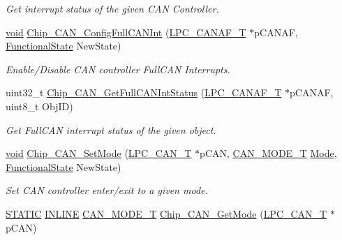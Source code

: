 \begin{DoxyCompactItemize}
\begin{DoxyCompactList}\small\item\em Get interrupt status of the given C\-A\-N Controller. \end{DoxyCompactList}\item 
\hyperlink{Paradigm_2Tern__EE_2small_2portmacro_8h_a14d32f8130d3c0b212cfc751730b5b49}{void} \hyperlink{group__CAN__17XX__40XX_ga90ebd27acbebb24951b5707abca13220}{Chip\-\_\-\-C\-A\-N\-\_\-\-Config\-Full\-C\-A\-N\-Int} (\hyperlink{structLPC__CANAF__T}{L\-P\-C\-\_\-\-C\-A\-N\-A\-F\-\_\-\-T} $\ast$p\-C\-A\-N\-A\-F, \hyperlink{group__LPC__Types__Public__Types_gac9a7e9a35d2513ec15c3b537aaa4fba1}{Functional\-State} New\-State)
\begin{DoxyCompactList}\small\item\em Enable/\-Disable C\-A\-N controller Full\-C\-A\-N Interrupts. \end{DoxyCompactList}\item 
uint32\-\_\-t \hyperlink{group__CAN__17XX__40XX_gaf955e0441bf4ca24b8c72f59aabbd9e8}{Chip\-\_\-\-C\-A\-N\-\_\-\-Get\-Full\-C\-A\-N\-Int\-Status} (\hyperlink{structLPC__CANAF__T}{L\-P\-C\-\_\-\-C\-A\-N\-A\-F\-\_\-\-T} $\ast$p\-C\-A\-N\-A\-F, uint8\-\_\-t Obj\-I\-D)
\begin{DoxyCompactList}\small\item\em Get Full\-C\-A\-N interrupt status of the given object. \end{DoxyCompactList}\item 
\hyperlink{Paradigm_2Tern__EE_2small_2portmacro_8h_a14d32f8130d3c0b212cfc751730b5b49}{void} \hyperlink{group__CAN__17XX__40XX_gad935e9c3c93278bb18b99df67ba52516}{Chip\-\_\-\-C\-A\-N\-\_\-\-Set\-Mode} (\hyperlink{structLPC__CAN__T}{L\-P\-C\-\_\-\-C\-A\-N\-\_\-\-T} $\ast$p\-C\-A\-N, \hyperlink{group__CAN__17XX__40XX_ga57c03b9f9b4ebf86dccc13baf8c2889c}{C\-A\-N\-\_\-\-M\-O\-D\-E\-\_\-\-T} \hyperlink{ioat91sam7x256_8h_a2c3349c7d637bdca4752c232da5df71c}{Mode}, \hyperlink{group__LPC__Types__Public__Types_gac9a7e9a35d2513ec15c3b537aaa4fba1}{Functional\-State} New\-State)
\begin{DoxyCompactList}\small\item\em Set C\-A\-N controller enter/exit to a given mode. \end{DoxyCompactList}\item 
\hyperlink{group__LPC__Types__Public__Macros_ga10b2d890d871e1489bb02b7e70d9bdfb}{S\-T\-A\-T\-I\-C} \hyperlink{group__LPC__Types__Public__Types_ga2eb6f9e0395b47b8d5e3eeae4fe0c116}{I\-N\-L\-I\-N\-E} \hyperlink{group__CAN__17XX__40XX_ga57c03b9f9b4ebf86dccc13baf8c2889c}{C\-A\-N\-\_\-\-M\-O\-D\-E\-\_\-\-T} \hyperlink{group__CAN__17XX__40XX_gaee6c1afaca19ff9c9ad2ee1bab77a713}{Chip\-\_\-\-C\-A\-N\-\_\-\-Get\-Mode} (\hyperlink{structLPC__CAN__T}{L\-P\-C\-\_\-\-C\-A\-N\-\_\-\-T} $\ast$p\-C\-A\-N)

\end{DoxyCompactItemize}
